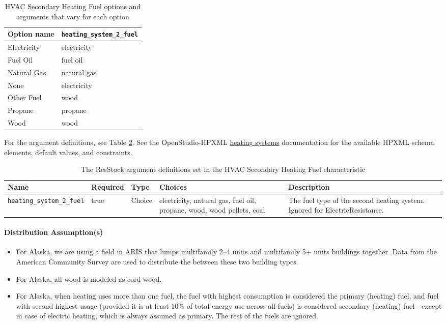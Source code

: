 \begin{longtable}[]{ |p{3cm}|p{3cm}| } \caption{HVAC Secondary Heating Fuel options and arguments that vary for each option} \label{table:hc_opt_hvac_sec_heat_fuel} \\  

\toprule\noalign{}
Option name & \texttt{heating\_system\_2\_fuel} \\
\midrule\noalign{}
\endhead
\bottomrule\noalign{}
\endlastfoot
Electricity & electricity \\
Fuel Oil & fuel oil \\
Natural Gas & natural gas \\
None & electricity \\
Other Fuel & wood \\
Propane & propane \\
Wood & wood \\
\end{longtable}

For the argument definitions, see Table \ref{table:hc_arg_def_hvac_sec_heat_fuel}. See the OpenStudio-HPXML \href{https://openstudio-hpxml.readthedocs.io/en/v1.8.1/workflow_inputs.html#hpxml-heating-systems}{heating systems} documentation for the available HPXML schema elements, default values, and constraints.


\begin{longtable}[]{|p{3.5cm}|p{1.1cm}|p{1.5cm}|p{3.3cm}|p{3.3cm}|} \caption{The ResStock argument definitions set in the HVAC Secondary Heating Fuel characteristic} \label{table:hc_arg_def_hvac_sec_heat_fuel} \\

\toprule\noalign{}
Name & Required & Type & Choices & Description \\
\midrule\noalign{}
\endhead
\bottomrule\noalign{}
\endlastfoot
\texttt{heating\_system\_2\_fuel} & true & Choice & electricity,
natural gas, fuel oil, propane, wood, wood pellets, coal & The fuel type
of the second heating system. Ignored for ElectricResistance. \\
\end{longtable}

\paragraph{Distribution Assumption(s)}

\begin{itemize}
    \item For Alaska, we are using a field in ARIS that lumps multifamily 2--4 units and multifamily 5+ units buildings together. Data from the American Community Survey are used to distribute the between these two building types.
    \item For Alaska, all wood is modeled as cord wood.
    \item For Alaska, when heating uses more than one fuel, the fuel with highest consumption is considered the primary (heating) fuel, and fuel with second highest usage (provided it is at least 10\% of total energy use across all fuels) is considered secondary (heating) fuel---except in case of electric heating, which is always assumed as primary. The rest of the fuels are ignored.
\end{itemize}
 

